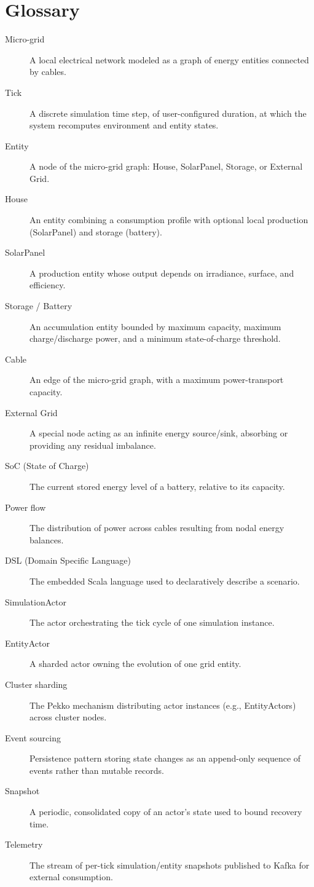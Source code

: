 \documentclass{scrreprt}
\begin{document}
  \section{Glossary}
  \label{sec:glossary}

  \begin{description}
    \item[Micro-grid] A local electrical network modeled as a graph of
  energy
      entities connected by cables.
    \item[Tick] A discrete simulation time step, of user-configured
  duration,
      at which the system recomputes environment and entity states.
    \item[Entity] A node of the micro-grid graph: House, SolarPanel,
  Storage,
      or External Grid.
    \item[House] An entity combining a consumption profile with optional
  local
      production (SolarPanel) and storage (battery).
    \item[SolarPanel] A production entity whose output depends on
  irradiance,
      surface, and efficiency.
    \item[Storage / Battery] An accumulation entity bounded by maximum
      capacity, maximum charge/discharge power, and a minimum
  state-of-charge
      threshold.
    \item[Cable] An edge of the micro-grid graph, with a maximum
      power-transport capacity.
    \item[External Grid] A special node acting as an infinite energy
      source/sink, absorbing or providing any residual imbalance.
    \item[SoC (State of Charge)] The current stored energy level of a
  battery,
      relative to its capacity.
    \item[Power flow] The distribution of power across cables resulting from
      nodal energy balances.
    \item[DSL (Domain Specific Language)] The embedded Scala language used
  to
      declaratively describe a scenario.
    \item[SimulationActor] The actor orchestrating the tick cycle of one
      simulation instance.
    \item[EntityActor] A sharded actor owning the evolution of one grid
      entity.
    \item[Cluster sharding] The Pekko mechanism distributing actor instances
      (e.g., EntityActors) across cluster nodes.
    \item[Event sourcing] Persistence pattern storing state changes as an
      append-only sequence of events rather than mutable records.
    \item[Snapshot] A periodic, consolidated copy of an actor's state used
  to
      bound recovery time.
    \item[Telemetry] The stream of per-tick simulation/entity snapshots
      published to Kafka for external consumption.
  \end{description}
\end{document}
